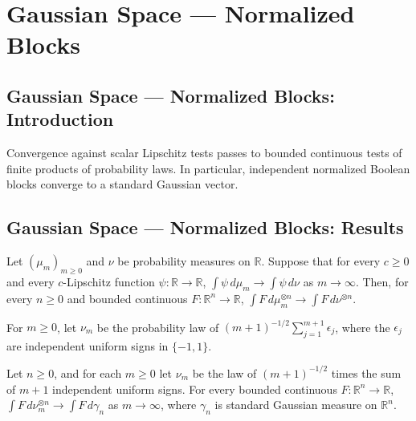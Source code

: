 \section{Gaussian Space --- Normalized Blocks}
\subsection*{Gaussian Space --- Normalized Blocks: Introduction}
Convergence against scalar Lipschitz tests passes to bounded continuous tests of finite products of probability laws. In particular, independent normalized Boolean blocks converge to a standard Gaussian vector.

\subsection*{Gaussian Space --- Normalized Blocks: Results}

\begin{lemma}
\leanok
{}
Let $(\mu_m)_{m\ge0}$ and $\nu$ be probability measures on $\mathbb R$. Suppose that for
every $c\ge0$ and every $c$-Lipschitz function $\psi:\mathbb R\to\mathbb R$,
$\int\psi\,d\mu_m\to\int\psi\,d\nu$ as $m\to\infty$. Then, for every $n\ge0$ and bounded
continuous $F:\mathbb R^n\to\mathbb R$, $\int F\,d\mu_m^{\otimes n}\to\int
F\,d\nu^{\otimes n}$.
\end{lemma}

\begin{definition}
\leanok
{}
For $m\ge0$, let $\nu_m$ be the probability law of $(m+1)^{-1/2}\sum_{j=1}^{m+1}\epsilon_j$, where the $\epsilon_j$ are independent uniform signs in $\{-1,1\}$.
\end{definition}

\begin{lemma}
\leanok
{}
Let $n\ge0$, and for each $m\ge0$ let $\nu_m$ be the law of $(m+1)^{-1/2}$ times the sum
of $m+1$ independent uniform signs. For every bounded continuous $F:\mathbb
R^n\to\mathbb R$, $\int F\,d\nu_m^{\otimes n}\to\int F\,d\gamma_n$ as $m\to\infty$,
where $\gamma_n$ is standard Gaussian measure on $\mathbb R^n$.
\end{lemma}

